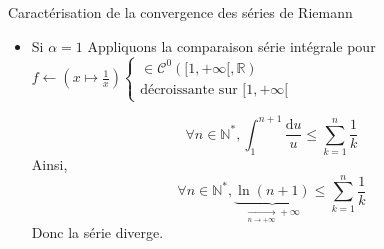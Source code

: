 \documentclass{article}
\begin{document}
\begin{question_kholle}{Caractérisation de la convergence des séries de Riemann}
\begin{itemize}[label=$\lozenge$]
\begin{itemize}[label=$\star$]
            Donc par transitivité, puisque $\sum_{n\geqslant 1} \frac{1}{n^{\alpha}}$ est de même nature que $\sum_{n\geqslant 1} \frac{-(\alpha-1)}{n^{\alpha}}$, la série de Riemann est de même nature que $\left( \frac{1}{n^{\alpha-1}} \right)_{n\geqslant 1}$
            Or, $\left( \frac{1}{n^{\alpha-1}} \right)_{n\geqslant 1}$ converge pour $\alpha>1$ et diverge pour $\alpha \in ]0, 1[$.
            
            \item Si $\alpha = 1$
            Appliquons la comparaison série intégrale pour $f \leftarrow (x \mapsto \frac{1}{x}) \left\{ \begin{array}{ll} \in \mathcal{C}^{0}([1, +\infty[, \mathbb{R})\\ \text{décroissante sur }[1, +\infty[ \end{array}\right.$
            
            $$\forall n \in \mathbb{N}^{*}, \int_{1}^{n+1}  \frac{\mathrm{d}u}{u} \leqslant  \sum_{k=1}^{n} \frac{1}{k}$$
            Ainsi,
            $$\forall n \in \mathbb{N}^{*}, \underbrace{ \ln(n+1) }_{ \xrightarrow[n \to +\infty]{} +\infty } \leqslant \sum_{k=1}^{n} \frac{1}{k}$$
            Donc la série diverge.
        \end{itemize}
    \end{itemize}
\end{question_kholle}
\end{document}
